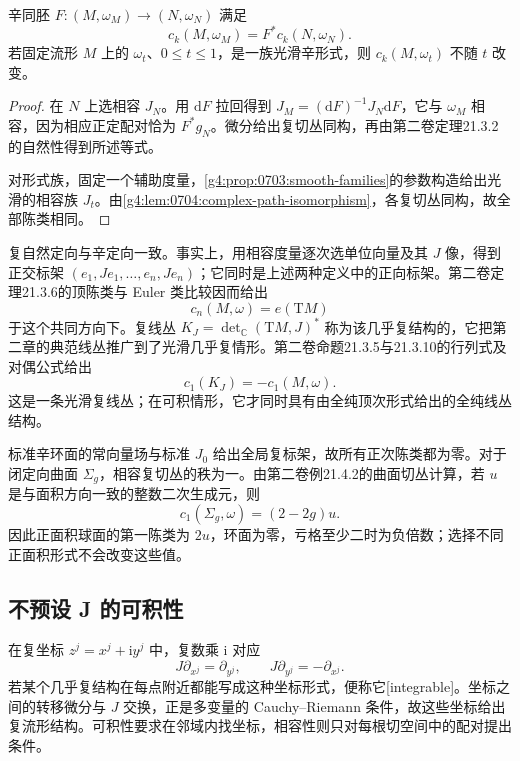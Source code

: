 \begin{proposition}\label{g4:prop:0704:chern-invariance}
	辛同胚 \(F:(M,\omega_M)\to(N,\omega_N)\) 满足
	\[
		c_k(M,\omega_M)=F^*c_k(N,\omega_N).
	\]
	若固定流形 \(M\) 上的 \(\omega_t\)、\(0\le t\le1\)，是一族光滑辛形式，则 \(c_k(M,\omega_t)\) 不随 \(t\) 改变。
\end{proposition}
\begin{proof}
	在 \(N\) 上选相容 \(J_N\)。用 \(\mathrm{d}F\) 拉回得到 \(J_M=(\mathrm{d}F)^{-1}J_N\mathrm{d}F\)，它与 \(\omega_M\) 相容，因为相应正定配对恰为 \(F^*g_N\)。微分给出复切丛同构，再由第二卷定理21.3.2的自然性得到所述等式。

	对形式族，固定一个辅助度量，\cref{g4:prop:0703:smooth-families}的参数构造给出光滑的相容族 \(J_t\)。由\cref{g4:lem:0704:complex-path-isomorphism}，各复切丛同构，故全部陈类相同。
\end{proof}

复自然定向与辛定向一致。事实上，用相容度量逐次选单位向量及其 \(J\) 像，得到正交标架 \((e_1,Je_1,\ldots,e_n,Je_n)\)；它同时是上述两种定义中的正向标架。第二卷定理21.3.6的顶陈类与 Euler 类比较因而给出
\[
	c_n(M,\omega)=e(\mathrm{T}M)
\]
于这个共同方向下。复线丛 \(K_J=\det_{\mathbb C}(\mathrm{T}M,J)^*\) 称为该几乎复结构的，它把第二章的典范线丛推广到了光滑几乎复情形。第二卷命题21.3.5与21.3.10的行列式及对偶公式给出
\[
	c_1(K_J)=-c_1(M,\omega).
\]
这是一条光滑复线丛；在可积情形，它才同时具有由全纯顶次形式给出的全纯线丛结构。

\begin{example}\label{g4:exm:0704:chern-models}
	标准辛环面的常向量场与标准 \(J_0\) 给出全局复标架，故所有正次陈类都为零。对于闭定向曲面 \(\Sigma_g\)，相容复切丛的秩为一。由第二卷例21.4.2的曲面切丛计算，若 \(u\) 是与面积方向一致的整数二次生成元，则
	\[
		c_1(\Sigma_g,\omega)=(2-2g)u.
	\]
	因此正面积球面的第一陈类为 \(2u\)，环面为零，亏格至少二时为负倍数；选择不同正面积形式不会改变这些值。
\end{example}

\subsection{不预设 J 的可积性}
\label{g4:subsec:0704:04}

在复坐标 \(z^j=x^j+\mathrm{i}y^j\) 中，复数乘 \(\mathrm{i}\) 对应
\[
	J\partial_{x^j}=\partial_{y^j},\qquad
	J\partial_{y^j}=-\partial_{x^j}.
\]
若某个几乎复结构在每点附近都能写成这种坐标形式，便称它[integrable]。坐标之间的转移微分与 \(J\) 交换，正是多变量的 Cauchy--Riemann 条件，故这些坐标给出复流形结构。可积性要求在邻域内找坐标，相容性则只对每根切空间中的配对提出条件。

